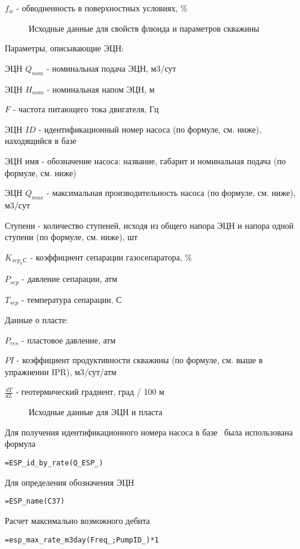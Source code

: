 $f_w$ - обводненность в поверхностных условиях, \%

\begin{figure}[h!]
	\center{\texttt{[image: Ex70\_1]}}
	\caption{Исходные данные для свойств флюида и параметров скважины}
	\label{ris:Ex70_1}
\end{figure}

Параметры, описывающие ЭЦН: 

ЭЦН $Q_{nom}$ - номинальная подача ЭЦН, м3/сут

ЭЦН $H_{nom}$ - номинальная напом ЭЦН, м

$F$ - частота питающего тока двигателя, Гц

ЭЦН $ID$ - идентификационный номер насоса (по формуле, см. ниже), находящийся в базе \unf

ЭЦН имя - обозначение насоса: название, габарит и номинальная подача (по формуле, см. ниже)

ЭЦН $Q_{max}$ - максимальная производительность насоса (по формуле, см. ниже), м3/сут

Ступени - количество ступеней, исходя из общего напора ЭЦН и напора одной ступени (по формуле, см. ниже), шт

$K_{sep_ГС}$ - коэффициент сепарации газосепаратора, \%

$P_{sep}$ - давление сепарации, атм

$T_{sep}$ - температура сепарации, С

Данные о пласте:

$P_{res}$ - пластовое давление, атм

$PI$ - коэффициент продуктивности скважины (по формуле, см. выше в упражнении IPR), м3/сут/атм

$\frac{dT}{dL}$ - геотермический градиент, град / 100 м

\begin{figure}[h!]
	\center{\texttt{[image: Ex70\_2]}}
	\caption{Исходные данные для ЭЦН и пласта}
	\label{ris:Ex70_2}
\end{figure}

Для получения идентификационного номера насоса в базе \unf \ была использована формула

{ \small  \texttt{=ESP\_id\_by\_rate(Q\_ESP\_)}}

Для определения обозначения ЭЦН

{ \small  \texttt{=ESP\_name(C37)}}

Расчет максимально возможного дебита

{ \small  \texttt{=esp\_max\_rate\_m3day(Freq\_;PumpID\_)*1}}

